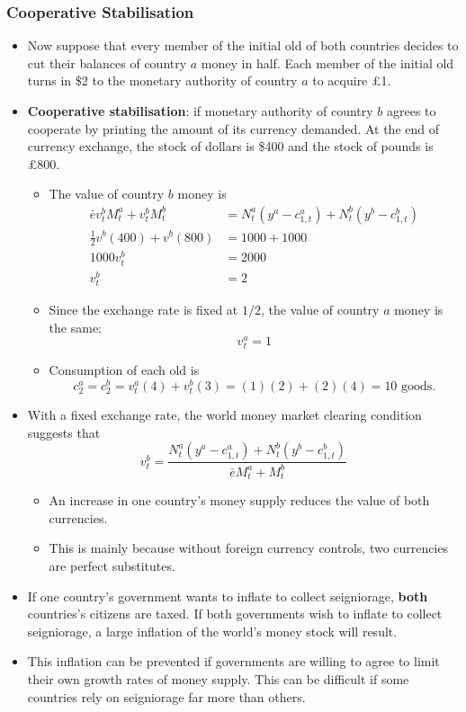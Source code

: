 \documentclass[a4paper,twoside]{article}
\newif\IfInSansMode
\numberwithin{equation}{section}
\numberwithin{figure}{section}
\begin{document}
\subsubsection{Cooperative Stabilisation}
	\begin{itemize}
		\item Now suppose that every member of the initial old of both countries decides to cut their balances of country \( a \) money in half. Each member of the initial old turns in \$2 to the monetary authority of country \( a \) to acquire \pounds1.
		\item \textbf{Cooperative stabilisation}: if monetary authority of country \( b \) agrees to cooperate by printing the amount of its currency demanded. At the end of currency exchange, the stock of dollars is \$400 and the stock of pounds is \pounds800.
		\begin{itemize}
			\item The value of country \( b \) money is
			\begin{align*}
				\bar{e}v_t^b M_t^a + v_t^b M_t^b &= N_t^a \left(y^a - c_{1,t}^a\right) + N_t^b \left(y^b - c_{1,t}^b\right)\\
				\frac{1}{2}v^b(400) +v^b(800) &= 1000 + 1000\\
				1000 v_t^b &= 2000\\
				v_t^b &= 2
			\end{align*}
			\item Since the exchange rate is fixed at \( 1/2 \), the value of country \( a \) money is the same:
			\[
				v_t^a = 1
			\]
			\item Consumption of each old is
			\[
			c_2^a = c_2^b = v_t^a(4)+v_t^b(3) = (1)(2) + (2)(4) = 10 \text{ goods.}
			\]
		\end{itemize}
		\item With a fixed exchange rate, the world money market clearing condition suggests that
		\[
			v_t^b = \frac{N_t^a \left(y^a - c_{1,t}^a\right) + N_t^b \left(y^b - c_{1,t}^b\right)}{\bar{e}M_t^a+M_t^b}
		\]
		\begin{itemize}
			\item An increase in one country's money supply reduces the value of both currencies.
			\item This is mainly because without foreign currency controls, two currencies are perfect substitutes.
		\end{itemize}
		\item If one country's government wants to inflate to collect seigniorage, \textbf{both} countries's citizens are taxed. If both governments wish to inflate to collect seigniorage, a large inflation of the world's money stock will result.
		\item This inflation can be prevented if governments are willing to agree to limit their own growth rates of money supply. This can be difficult if some countries rely on seigniorage far more than others.
	\end{itemize}
\end{document}
